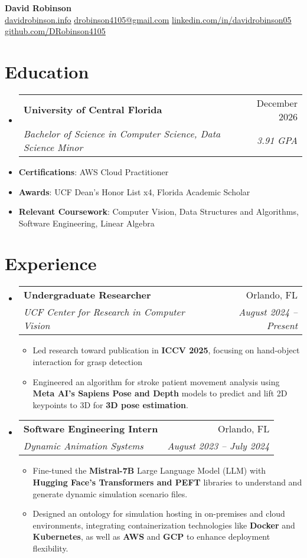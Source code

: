 \documentclass[letterpaper,11pt]{article}
\makeatletter
\newcommand{\resumeItem}[1]{
  \item\small{
    {#1 \vspace{-2pt}}
  }
}
\newcommand{\educationItem}[1]{
  \item\small{
    {#1 \vspace{-5pt}}
  }
}
\newcommand{\resumeSubheading}[4]{
  \vspace{-2pt}\item
    \begin{tabular*}{0.97\textwidth}[t]{l@{\extracolsep{\fill}}r}
      \textbf{#1} & #2 \\
      \textit{\small#3} & \textit{\small #4} \\
    \end{tabular*}\vspace{-7pt}
}
\newcommand{\resumeSubHeadingListStart}{\begin{itemize}[leftmargin=0.15in, label={}]}
\newcommand{\resumeSubHeadingListEnd}{\end{itemize}}
\newcommand{\resumeItemListStart}{\begin{itemize}}
\newcommand{\resumeItemListEnd}{\end{itemize}\vspace{-5pt}}
\makeatother
\begin{document}
\begin{center}
  \textbf{\Huge David Robinson} \\ \vspace{2pt} \small
  \faCode\hspace{0.25pt} \href{https://www.davidrobinson.info/}{\uline{davidrobinson.info}}
  \faEnvelope\hspace{0.25pt} \href{mailto:drobinson4105@gmail.com}{\uline{drobinson4105@gmail.com}}
  \faLinkedin\hspace{0.25pt} \href{https://linkedin.com/in/davidrobinson05}{\uline{linkedin.com/in/davidrobinson05}}
  \faGithub\hspace{0.25pt} \href{https://github.com/DRobinson4105}{\uline{github.com/DRobinson4105}}
\end{center}

\section{Education}
  \resumeSubHeadingListStart
    \resumeSubheading
      {University of Central Florida}{December 2026}
      {Bachelor of Science in Computer Science, Data Science Minor}{3.91 GPA}
    \educationItem{\textbf{Certifications}: AWS Cloud Practitioner}
    \educationItem{\textbf{Awards}: UCF Dean's Honor List x4, Florida Academic Scholar}
    \educationItem{\textbf{Relevant Coursework}: Computer Vision, Data Structures and Algorithms, Software Engineering, Linear Algebra}
  \resumeSubHeadingListEnd

\section{Experience}
  \resumeSubHeadingListStart
    \resumeSubheading
      {Undergraduate Researcher}{Orlando, FL}
      {UCF Center for Research in Computer Vision}{August 2024 -- Present}
      \resumeItemListStart
        \resumeItem{Led research toward publication in \textbf{ICCV 2025}, focusing on hand-object interaction for grasp detection}
        \resumeItem{Engineered an algorithm for stroke patient movement analysis using \textbf{Meta AI's Sapiens Pose and Depth} models to predict and lift 2D keypoints to 3D for \textbf{3D pose estimation}.}
      \resumeItemListEnd
    \resumeSubheading
      {Software Engineering Intern}{Orlando, FL}
      {Dynamic Animation Systems}{August 2023 -- July 2024}
      \resumeItemListStart
        \resumeItem{Fine-tuned the \textbf{Mistral-7B} Large Language Model (LLM) with \textbf{Hugging Face's Transformers and PEFT} libraries to understand and generate dynamic simulation scenario files.}
        \resumeItem{Designed an ontology for simulation hosting in on-premises and cloud environments, integrating containerization technologies like \textbf{Docker} and \textbf{Kubernetes}, as well as \textbf{AWS} and \textbf{GCP} to enhance deployment flexibility.}
      \resumeItemListEnd
  \resumeSubHeadingListEnd
\end{document}
